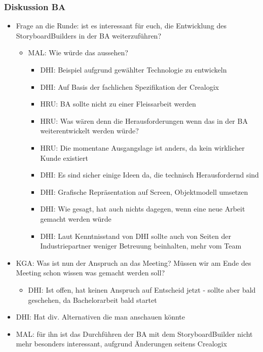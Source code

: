 \subsubsection*{Diskussion BA}
\begin{itemize}
	\item Frage an die Runde: ist es interessant für euch, die Entwicklung des StoryboardBuilders in der BA weiterzuführen?
	\begin{itemize}
		\item MAL: Wie würde das aussehen?
		\begin{itemize}
			\item DHI: Beispiel aufgrund gewählter Technologie zu entwickeln
			\item DHI: Auf Basis der fachlichen Spezifikation der Crealogix
			\item HRU: BA sollte nicht zu einer Fleissarbeit werden
			\item HRU: Was wären denn die Herausforderungen wenn das in der BA weiterentwickelt werden würde?
			\item HRU: Die momentane Ausgangslage ist anders, da kein wirklicher Kunde existiert
			\item DHI: Es sind sicher einige Ideen da, die technisch Herausfordernd sind
			\item DHI: Grafische Repräsentation auf Screen, Objektmodell umsetzen
			\item DHI: Wie gesagt, hat auch nichts dagegen, wenn eine neue Arbeit gemacht werden würde
			\item DHI: Laut Kenntnisstand von DHI sollte auch von Seiten der Industriepartner weniger Betreuung beinhalten, mehr vom Team
		\end{itemize}
	\end{itemize}
	\item KGA: Was ist nun der Anspruch an das Meeting? Müssen wir am Ende des Meeting schon wissen was gemacht werden soll?
	\begin{itemize}
		\item DHI: Ist offen, hat keinen Anspruch auf Entscheid jetzt - sollte aber bald geschehen, da Bachelorarbeit bald startet
	\end{itemize}
	\item DHI: Hat div. Alternativen die man anschauen könnte
	\item MAL: für ihn ist das Durchführen der BA mit dem StoryboardBuilder nicht mehr besonders interessant, aufgrund Änderungen seitens Crealogix
	\begin{itemize}

\end{itemize}
\end{itemize}

